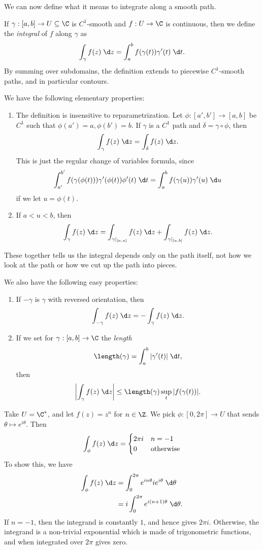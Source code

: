 \documentclass[a4paper]{article}
\begin{document}
We can now define what it means to integrate along a smooth path.
\begin{defi}
  If $\gamma: [a, b] \to U \subseteq \C$ is $C^1$-smooth and $f: U \to \C$ is continuous, then we define the \emph{integral} of $f$ along $\gamma$ as
  \[
    \int_\gamma f(z) \;\d z = \int_a^b f(\gamma(t)) \gamma'(t) \;\d t.
  \]
  By summing over subdomains, the definition extends to piecewise $C^1$-smooth paths, and in particular contours.
\end{defi}

We have the following elementary properties:
\begin{enumerate}
  \item The definition is insensitive to reparametrization. Let $\phi: [a', b'] \to [a, b]$ be $C^1$ such that $\phi(a') = a, \phi(b') = b$. If $\gamma$ is a $C^1$ path and $\delta= \gamma \circ \phi$, then
    \[
      \int_{\gamma} f(z) \;\d z = \int_{\delta}f(z) \;\d z.
    \]
    This is just the regular change of variables formula, since
    \[
      \int_{a'}^{b'} f(\gamma(\phi(t))) \gamma'(\phi(t)) \phi'(t)\;\d t= \int_a^b f(\gamma(u)) \gamma'(u)\;\d u
    \]
    if we let $u = \phi(t)$.
  \item If $a < u < b$, then
    \[
      \int_\gamma f(z)\;\d z = \int_{\gamma|_{[a, u]}} f(z)\;\d z + \int_{\gamma|_{[u, b]}}f(z) \;\d z.
    \]
\end{enumerate}
These together tells us the integral depends only on the path itself, not how we look at the path or how we cut up the path into pieces.

We also have the following easy properties:
\begin{enumerate}[resume]
  \item If $-\gamma$ is $\gamma$ with reversed orientation, then
    \[
      \int_{-\gamma} f(z)\;\d z = -\int_\gamma f(z)\;\d z.
    \]
  \item If we set for $\gamma: [a, b] \to \C$ the \emph{length}
    \[
      \length(\gamma) = \int_a^b |\gamma'(t)|\;\d t,
    \]
    then
    \[
      \left|\int_\gamma f(z)\;\d z\right| \leq \length (\gamma) \sup_t |f(\gamma(t))|.
    \]
\end{enumerate}

\begin{eg}
  Take $U = \C^*$, and let $f(z) = z^n$ for $n \in \Z$. We pick $\phi: [0, 2\pi] \to U$ that sends $\theta \mapsto e^{i\theta}$. Then
  \[
    \int_\phi f(z)\;\d z =
    \begin{cases}
      2\pi i & n = -1\\
      0& \text{otherwise}
    \end{cases}
  \]
  To show this, we have
  \begin{align*}
    \int_{\phi} f(z)\;\d z &= \int_0^{2\pi} e^{in\theta} ie^{i\theta}\;\d \theta\\
    &= i\int_0^{2\pi} e^{i(n + 1)\theta}\;\d \theta.
  \end{align*}
  If $n = -1$, then the integrand is constantly $1$, and hence gives $2\pi i$. Otherwise, the integrand is a non-trivial exponential which is made of trigonometric functions, and when integrated over $2\pi$ gives zero.
\end{eg}
\end{document}
